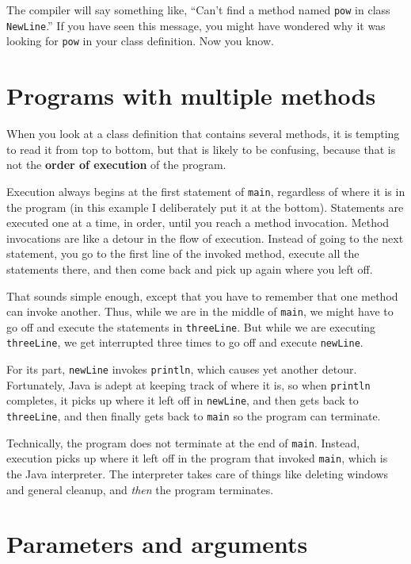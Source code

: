 The compiler will say something like, ``Can't find a method named {\tt pow} in class {\tt NewLine}.''
If you have seen this message, you might have wondered why it was looking for {\tt pow} in your class definition.
Now you know.


\section{Programs with multiple methods}

When you look at a class definition that contains several methods, it is tempting to read it from top to bottom, but that is likely to be confusing, because that is not the {\bf order of execution} of the program.

Execution always begins at the first statement of {\tt main}, regardless of where it is in the program (in this example I deliberately put it at the bottom).
Statements are executed one at a time, in order, until you reach a method invocation.
Method invocations are like a detour in the flow of execution.
Instead of going to the next statement, you go to the first line of the invoked method, execute all the statements there, and then come back and pick up again where you left off.

That sounds simple enough, except that you have to remember that one method can invoke another.
Thus, while we are in the middle of {\tt main}, we might have to go off and execute the statements in {\tt threeLine}.
But while we are executing {\tt threeLine}, we get interrupted three times to go off and execute {\tt newLine}.

For its part, {\tt newLine} invokes {\tt println}, which causes yet another detour.
Fortunately, Java is adept at keeping track of where it is, so when {\tt println} completes, it picks up where it left off in {\tt newLine}, and then gets back to {\tt threeLine}, and then finally gets back to {\tt main} so the program can terminate.

Technically, the program does not terminate at the end of {\tt main}.
Instead, execution picks up where it left off in the program that invoked {\tt main}, which is the Java interpreter.
The interpreter takes care of things like deleting windows and general cleanup, and {\em then} the program terminates.



\section{Parameters and arguments}

